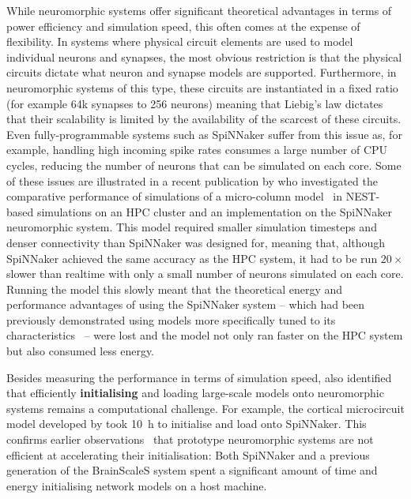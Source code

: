 \documentclass[utf8]{frontiersSCNS} %
\begin{document}
While neuromorphic systems offer significant theoretical advantages in terms of power efficiency and simulation speed, this often comes at the expense of flexibility.
In systems where physical circuit elements are used to model individual neurons and synapses, the most obvious restriction is that the physical circuits dictate what neuron and synapse models are supported.
Furthermore, in neuromorphic systems of this type, these circuits are instantiated in a fixed ratio (for example 64k synapses to 256 neurons) meaning that Liebig's law dictates that their scalability is limited by the availability of the scarcest of these circuits.
Even fully-programmable systems such as SpiNNaker suffer from this issue as, for example, handling high incoming spike rates consumes a large number of CPU cycles, reducing the number of neurons that can be simulated on each core.
Some of these issues are illustrated in a recent publication by \citet{VanAlbada2018} who investigated the comparative performance of simulations of a micro-column model~\citep{Potjans2012} in NEST-based simulations on an HPC cluster and an implementation on the SpiNNaker neuromorphic system.
This model required smaller simulation timesteps and denser connectivity than SpiNNaker was designed for, meaning that, although SpiNNaker achieved the same accuracy as the HPC system, it had to be run $20\times$ slower than realtime with only a small number of neurons simulated on each core. 
Running the model this slowly meant that the theoretical energy and performance advantages of using the SpiNNaker system -- which had been previously demonstrated using models more specifically tuned to its characteristics~\citep{Sharp2012,Sharp2014,Knight2016} -- were lost and the model not only ran faster on the HPC system but also consumed less energy.

Besides measuring the performance in terms of simulation speed, \citet{VanAlbada2018} also identified that efficiently \textbf{initialising} and loading large-scale models onto neuromorphic systems remains a computational challenge. 
For example, the cortical microcircuit model developed by \citet{Potjans2012} took \SI{10}{\hour} to initialise and load onto SpiNNaker.
This confirms earlier observations~\citep{Diamond2018} that prototype neuromorphic systems are not efficient at accelerating their initialisation: Both SpiNNaker and a previous generation of the BrainScaleS system spent a significant amount of time and energy initialising network models on a host machine. 
\end{document}
